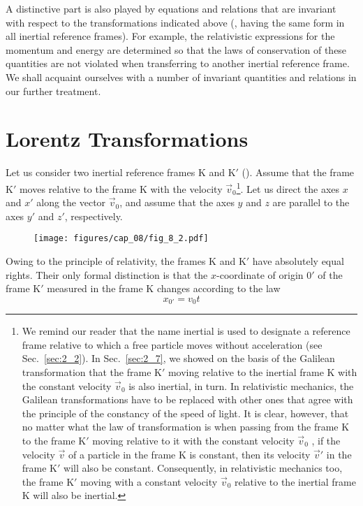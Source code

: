 A distinctive part is also played by equations and relations that are invariant with respect to the transformations indicated above (\ie, having the same form in all inertial reference frames). For example, the relativistic expressions for the momentum and energy are determined so that the laws of conservation of these quantities are not violated when transferring to another inertial reference frame. We shall acquaint ourselves with a number of invariant quantities and relations in our further treatment.

\section{Lorentz Transformations}\label{sec:8_2}

Let us consider two inertial reference frames K and K$'$ (). Assume that the frame K$'$ moves relative to the frame K with the velocity $\vec{v}_0$\footnote{We remind our reader that the name inertial is used to designate a reference frame relative to which a free particle moves without acceleration (see Sec.~\ref{sec:2_2}). In Sec.~\ref{sec:2_7}, we showed on the basis of the Galilean transformation that the frame K$'$ moving relative to the inertial frame K with the constant velocity	$\vec{v}_0$ is also inertial, in turn. In relativistic mechanics, the Galilean transformations have to be replaced with other ones that agree with the principle of the constancy of the speed of light. It is clear, however, that no matter what the law of transformation is when passing from the frame K to the frame K$'$ moving relative to it with the constant velocity $\vec{v}_0$ , if the velocity $\vec{v}$ of a particle in the frame K is constant, then its velocity $\vec{v}'$ in the frame K$'$ will also be constant. Consequently, in relativistic mechanics too, the frame K$'$ moving with a constant velocity $\vec{v}_0$ relative to the inertial frame K will also be inertial.}. Let us direct the axes $x$ and $x'$ along the vector $\vec{v}_0$, and assume that the axes $y$ and $z$ are parallel to the axes $y'$ and $z'$, respectively.

\begin{figure}[t]
	\begin{center}
		\texttt{[image: figures/cap\_08/fig\_8\_2.pdf]}
		\caption[]{}
		\label{fig:8_2}
	\end{center}
	\vspace{-0.8cm}
\end{figure}

Owing to the principle of relativity, the frames K and K$'$ have absolutely equal rights. Their only formal distinction is that the $x$-coordinate of origin $0'$ of the frame K$'$ measured in the frame K changes according to the law
\begin{equation}\label{eq:8_2}
	x_{0'} = v_0 t
\end{equation}

